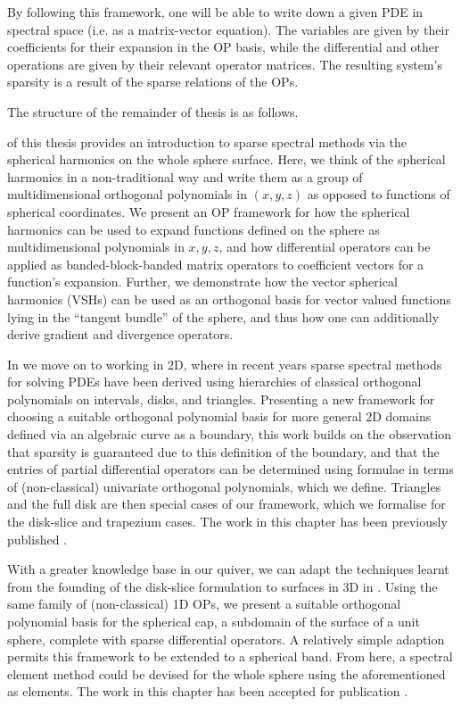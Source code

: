 By following this framework, one will be able to write down a given PDE in spectral space (i.e. as a matrix-vector equation). The variables are given by their coefficients for their expansion in the OP basis, while the differential and other operations are given by their relevant operator matrices. The resulting system's sparsity is a result of the sparse relations of the OPs.


The structure of the remainder of thesis is as follows.

 of this thesis provides an introduction to sparse spectral methods via the spherical harmonics on the whole sphere surface. Here, we think of the spherical harmonics in a non-traditional way and write them as a group of multidimensional orthogonal polynomials in $(x,y,z)$ as opposed to functions of spherical coordinates. We present an OP framework for how the spherical harmonics can be used to expand functions defined on the sphere as multidimensional polynomials in $x, y, z$, and how differential operators can be applied as banded-block-banded matrix operators to coefficient vectors for a function's expansion. Further, we demonstrate how the vector spherical harmonics (VSHs) can be used as an orthogonal basis for vector valued functions lying in the \enquote{tangent bundle} of the sphere, and thus how one can additionally derive gradient and divergence operators.

In  we move on to working in 2D, where in recent years sparse spectral methods for solving PDEs have been derived using hierarchies of classical orthogonal polynomials on intervals, disks, and triangles. Presenting a new framework for choosing a suitable orthogonal polynomial basis for more general 2D domains defined via an algebraic curve as a boundary, this work builds on the observation that sparsity is guaranteed due to this definition of the boundary, and that the entries of partial differential operators can be determined using formulae in terms of (non-classical) univariate orthogonal polynomials, which we define. Triangles and the full disk are then special cases of our framework, which we formalise for the disk-slice and trapezium cases. The work in this chapter has been previously published \cite{snowball2019sparse}.

With a greater knowledge base in our quiver, we can adapt the techniques learnt from the founding of the disk-slice formulation to surfaces in 3D in . Using the same family of (non-classical) 1D OPs, we present a suitable orthogonal polynomial basis for the spherical cap, a subdomain of the surface of a unit sphere, complete with sparse differential operators. A relatively simple adaption permits this framework to be extended to a spherical band. From here, a spectral element method could be devised for the whole sphere using the aforementioned as elements. The work in this chapter has been accepted for publication \cite{snowball2020sparse}.

